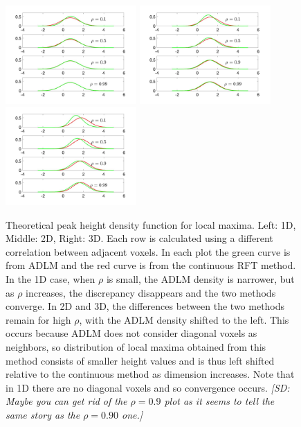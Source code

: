 \documentclass{article}
\newcommand{\sdcom}[1]{\textit{\color{red} [SD: #1]}}
\begin{document}
\begin{figure}[!htp]
  \centering
  \includegraphics[trim=50 50 50 50, clip, width = 50mm]{figure/1Dcase.jpg}
  \includegraphics[trim=50 50 50 50, clip, width = 50mm]{figure/2Dcase.jpg}
  \includegraphics[trim=50 50 50 50, clip, width = 50mm]{figure/3Dcase.jpg}
  \caption{Theoretical peak height density function for local maxima. Left: 1D, Middle: 2D, Right: 3D. Each row is calculated using a different correlation between adjacent voxels. In each plot the green curve is from ADLM and the red curve is from the continuous RFT method. In the 1D case, when $\rho$ is small, the ADLM density is narrower, but as $\rho$ increases, the discrepancy disappears and the two methods converge. In 2D and 3D, the differences between the two methods remain for high $\rho$, with the ADLM density shifted to the left. This occurs because ADLM does not consider diagonal voxels as neighbors, so distribution of local maxima obtained from this method consists of smaller height values and is thus left shifted relative to the continuous method as dimension increases. Note that in 1D there are no diagonal voxels and so convergence occurs. \sdcom{Maybe you can get rid of the $\rho = 0.9$ plot as it seems to tell the same story as the $\rho = 0.90$ one.}}
\label{fig1}
\end{figure}
\end{document}
